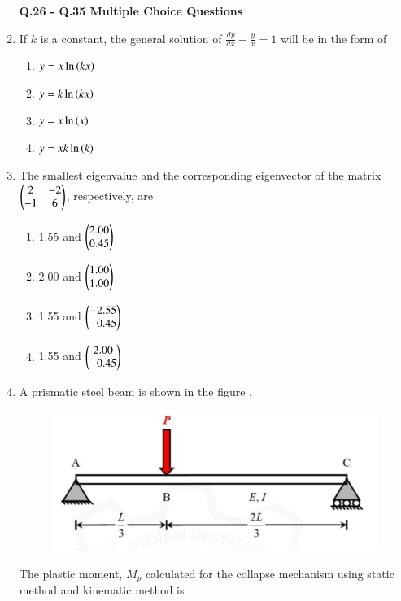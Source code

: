 \documentclass[journal,12pt,onecolumn]{article}
\theoremstyle{remark}
\begin{document}
\begin{enumerate}
\hfill{}

\textbf{Q.26 - Q.35 Multiple Choice Questions}
\item If $k$ is a constant, the general solution of $\frac{dy}{dx} - \frac{y}{x} = 1$ will be in the form of

\hfill{}

\begin{multicols}{2}
\begin{enumerate}
    \item $y = x\ln\left(kx\right)$
    \item $y = k\ln\left(kx\right)$
    \item $y = x\ln\left(x\right)$
    \item $y = xk\ln\left(k\right)$
\end{enumerate}
\end{multicols}

\item The smallest eigenvalue and the corresponding eigenvector of the matrix $\begin{pmatrix}2 & -2 \\ -1 & 6\end{pmatrix}$, respectively, are

\hfill{}

\begin{enumerate}
    \item 1.55 and $\begin{pmatrix}2.00 \\ 0.45\end{pmatrix}$
    \item 2.00 and $\begin{pmatrix}1.00 \\ 1.00\end{pmatrix}$
    \item 1.55 and $\begin{pmatrix}-2.55 \\ -0.45\end{pmatrix}$
    \item 1.55 and $\begin{pmatrix}2.00 \\ -0.45\end{pmatrix}$
\end{enumerate}

\item A prismatic steel beam is shown in the figure  .
\begin{figure}[H]
    \centering
    \includegraphics[width=0.7\columnwidth]{figs/2q28.jpg}
    \caption{}
    \label{fig:q28}
\end{figure}
The plastic moment, $M_p$ calculated for the collapse mechanism using static method and kinematic method is


\end{enumerate}
\end{document}
